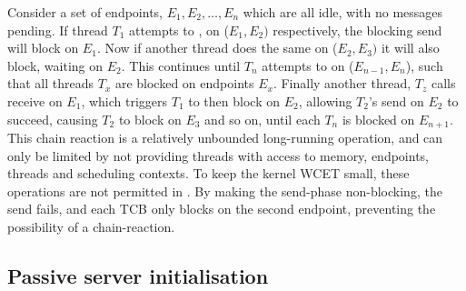 Consider a set of endpoints, $E_{1}, E_{2},\ldots,E_{n}$ which are all idle, with no messages
pending. If thread $T_{1}$ attempts to \sendrecv,
on ($E_{1},E_{2})$ respectively, the blocking send will block on $E_{1}$. Now if another thread
does the same on ($E_{2},E_{3})$ it will also block, waiting on $E_{2}$. This continues until
$T_{n}$ attempts to \sendrecv on ($E_{n-1},E_{n}$), such that all threads $T_{x}$ are blocked on
endpoints $E_{x}$. Finally another thread, $T_{z}$ calls receive on $E_{1}$, which triggers $T_{1}$ to then
block on $E_{2}$, allowing $T_{2}$'s send on $E_{2}$ to succeed, causing $T_{2}$ to block on
$E_{3}$ and so on, until each $T_{n}$ is blocked on $E_{n+1}$. This chain reaction is a relatively
unbounded long-running operation, and can only be limited by not providing threads with access to
memory, endpoints, threads and scheduling contexts. To keep the kernel \gls{WCET} small, these
operations are not permitted in \selfour. By making the send-phase non-blocking, the send fails, and
each \gls{TCB} only blocks on the second endpoint, preventing the possibility of a chain-reaction. 

\subsection{Passive server initialisation}


